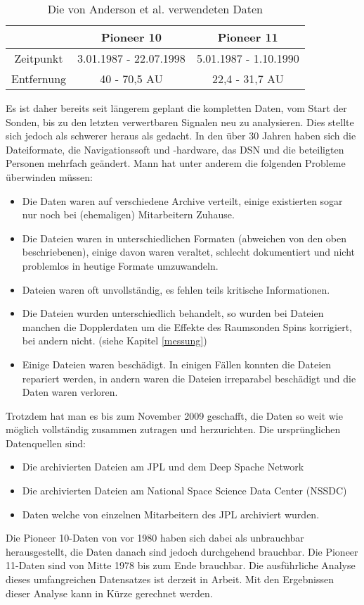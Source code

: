 \begin{table}[ht]
\centering
\begin{tabular}{|c|c|c|}
\hline & Pioneer 10 & Pioneer 11 \\ 
\hline Zeitpunkt & 3.01.1987 - 22.07.1998  & 5.01.1987 - 1.10.1990 \\ 
\hline Entfernung & 40 - 70,5 AU & 22,4 - 31,7 AU \\ 
\hline 
\end{tabular}
\caption{Die von Anderson et al. verwendeten Daten}
\label{tab:andersondaten}
\end{table}


Es ist daher bereits seit längerem geplant die kompletten Daten, vom Start der Sonden, bis zu den letzten verwertbaren Signalen neu zu analysieren. Dies stellte sich jedoch als schwerer heraus als gedacht. In den über 30 Jahren haben sich die Dateiformate, die Navigationssoft und -hardware, das DSN und die beteiligten Personen mehrfach geändert. Mann hat unter anderem die folgenden Probleme überwinden müssen:\cite{Turyshev2010}
\begin{itemize}
\item Die Daten waren auf verschiedene Archive verteilt, einige existierten sogar nur noch bei (ehemaligen) Mitarbeitern Zuhause.
\item Die Dateien waren in unterschiedlichen Formaten (abweichen von den oben beschriebenen), einige davon waren veraltet, schlecht dokumentiert und nicht problemlos in heutige Formate umzuwandeln.
\item Dateien waren oft unvollständig, es fehlen teils kritische Informationen.
\item Die Dateien wurden unterschiedlich behandelt, so wurden bei Dateien manchen die Dopplerdaten um die Effekte des Raumsonden Spins korrigiert, bei andern nicht. (siehe Kapitel \ref{messung})
\item Einige Dateien waren beschädigt. In einigen Fällen konnten die Dateien repariert werden, in andern waren die Dateien irreparabel beschädigt und die Daten waren verloren.
\end{itemize}
Trotzdem hat man es bis zum November 2009 geschafft, die Daten so weit wie möglich vollständig zusammen zutragen und herzurichten.
Die ursprünglichen Datenquellen sind: %
\begin{itemize}
\item Die archivierten Dateien am JPL und dem Deep Spache Network
\item Die archivierten Dateien am National Space Science Data Center (NSSDC)
\item Daten welche von einzelnen Mitarbeitern des JPL archiviert wurden.
\end{itemize}
Die Pioneer 10-Daten von vor 1980 haben sich dabei als unbrauchbar herausgestellt, die Daten danach sind jedoch durchgehend brauchbar. Die Pioneer 11-Daten sind von Mitte 1978 bis zum Ende brauchbar. Die ausführliche Analyse dieses umfangreichen Datensatzes ist derzeit in Arbeit.\cite{Turyshev2010} Mit den Ergebnissen dieser Analyse kann in Kürze gerechnet werden. %

